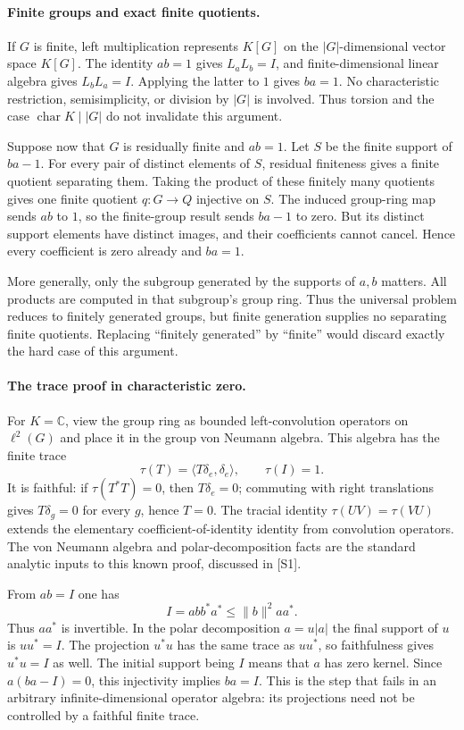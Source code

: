 \documentclass[11pt]{article}
\begin{document}
\paragraph{Finite groups and exact finite quotients.}
If $G$ is finite, left multiplication represents $K[G]$ on the
$|G|$-dimensional vector space $K[G]$. The identity $ab=1$ gives
$L_aL_b=I$, and finite-dimensional linear algebra gives $L_bL_a=I$.
Applying the latter to $1$ gives $ba=1$. No characteristic restriction,
semisimplicity, or division by $|G|$ is involved. Thus torsion and the
case $\operatorname{char}K\mid|G|$ do not invalidate this argument.

Suppose now that $G$ is residually finite and $ab=1$. Let $S$ be the
finite support of $ba-1$. For every pair of distinct elements of $S$,
residual finiteness gives a finite quotient separating them. Taking
the product of these finitely many quotients gives one finite quotient
$q:G\to Q$ injective on $S$. The induced group-ring map sends $ab$ to
$1$, so the finite-group result sends $ba-1$ to zero. But its distinct
support elements have distinct images, and their coefficients cannot
cancel. Hence every coefficient is zero already and $ba=1$.

More generally, only the subgroup generated by the supports of $a,b$
matters. All products are computed in that subgroup's group ring. Thus
the universal problem reduces to finitely generated groups, but finite
generation supplies no separating finite quotients. Replacing
``finitely generated'' by ``finite'' would discard exactly the hard
case of this argument.

\paragraph{The trace proof in characteristic zero.}
For $K=\mathbb C$, view the group ring as bounded left-convolution
operators on $\ell^2(G)$ and place it in the group von Neumann algebra.
This algebra has the finite trace
\[
 \tau(T)=\langle T\delta_e,\delta_e\rangle,
 \qquad\tau(I)=1.
\]
It is faithful: if $\tau(T^*T)=0$, then $T\delta_e=0$; commuting with
right translations gives $T\delta_g=0$ for every $g$, hence $T=0$.
The tracial identity $\tau(UV)=\tau(VU)$ extends the elementary
coefficient-of-identity identity from convolution operators. The
von Neumann algebra and polar-decomposition facts are the standard
analytic inputs to this known proof, discussed in [S1].

From $ab=I$ one has
\[
 I=abb^*a^*\le\|b\|^2aa^*.
\]
Thus $aa^*$ is invertible. In the polar decomposition $a=u|a|$ the
final support of $u$ is $uu^*=I$. The projection $u^*u$ has the same
trace as $uu^*$, so faithfulness gives $u^*u=I$ as well. The initial
support being $I$ means that $a$ has zero kernel. Since
$a(ba-I)=0$, this injectivity implies $ba=I$. This is the step that
fails in an arbitrary infinite-dimensional operator algebra: its
projections need not be controlled by a faithful finite trace.
\end{document}
